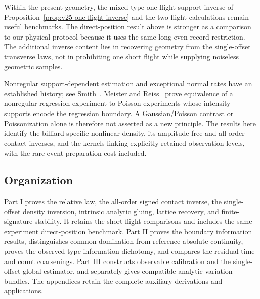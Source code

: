 Within the present geometry, the mixed-type one-flight support inverse of
Proposition~\ref{prop:v25-one-flight-inverse} and the two-flight calculations
remain useful benchmarks.  The direct-position result above is stronger as
a comparison to our physical protocol because it uses the same long even
record restriction.  The additional inverse content lies in recovering
geometry from the single-offset transverse laws, not in prohibiting one
short flight while supplying noiseless geometric samples.

Nonregular support-dependent estimation and exceptional normal rates have
an established history; see Smith~\cite{Smith1985}.  Meister and
Reiss~\cite{MeisterReiss} prove equivalence of a nonregular regression
experiment to Poisson experiments whose intensity supports encode the
regression boundary.  A Gaussian/Poisson contrast or Poissonization alone
is therefore not asserted as a new principle.  The results here identify
the billiard-specific nonlinear density, its amplitude-free and all-order
contact inverses, and the kernels linking explicitly retained observation
levels, with the rare-event preparation cost included.

\subsection{Organization}

Part I proves the relative law, the all-order signed contact inverse, the
single-offset density inversion, intrinsic analytic gluing, lattice recovery,
and finite-signature stability.  It retains the short-flight comparisons
and includes the same-experiment direct-position benchmark.  Part II proves the
boundary information results, distinguishes common domination from reference
absolute continuity, proves the observed-type information dichotomy,
and compares the residual-time and count coarsenings.
Part III constructs observable calibration and the single-offset global
estimator, and separately gives compatible analytic variation bundles.
The appendices retain the complete auxiliary derivations and applications.
